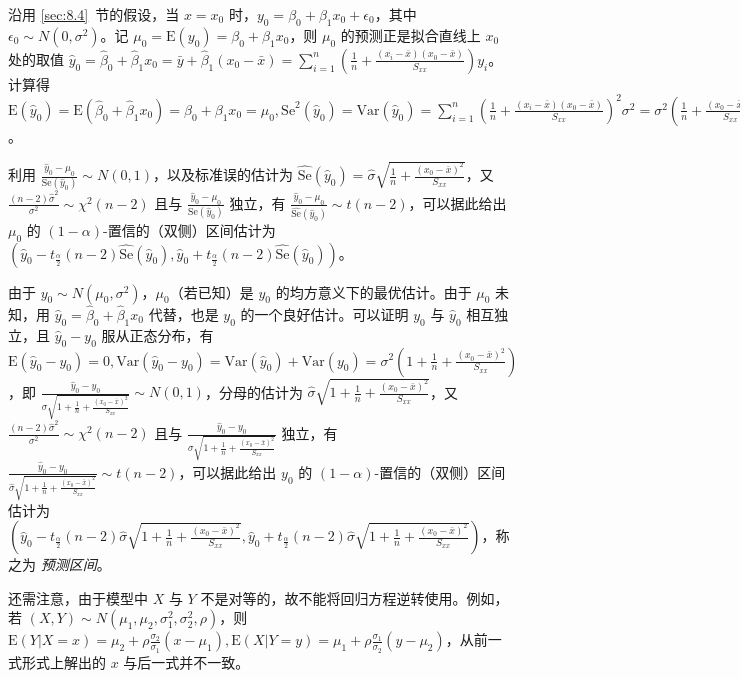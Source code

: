 \documentclass[../main.tex]{subfiles}
\begin{document}
沿用 \ref{sec:8.4}~节的假设，当 $x=x_0$ 时，$y_0=\beta_0+\beta_1x_0+\epsilon_0$，其中 $\epsilon_0\sim N(0,\sigma^2)$。记 $\mu_0=\mathrm E(y_0)=\beta_0+\beta_1x_0$，则 $\mu_0$ 的预测正是拟合直线上 $x_0$ 处的取值 $\hat y_0=\hat\beta_0+\hat\beta_1x_0=\bar y+\hat\beta_1(x_0-\bar x)=\sum_{i=1}^n(\frac1n+\frac{(x_i-\bar x)(x_0-\bar x)}{S_{xx}})y_i$。计算得 $\mathrm E(\hat y_0)=\mathrm E(\hat\beta_0+\hat\beta_1x_0)=\beta_0+\beta_1x_0=\mu_0,\mathrm{Se}^2(\hat y_0)=\mathrm{Var}(\hat y_0)=\sum_{i=1}^n(\frac1n+\frac{(x_i-\bar x)(x_0-\bar x)}{S_{xx}})^2\sigma^2=\sigma^2(\frac1n+\frac{(x_0-\bar x)^2}{S_{xx}})$。

利用 $\frac{\hat y_0-\mu_0}{\mathrm{Se}(\hat y_0)}\sim N(0,1)$，以及标准误的估计为 $\widehat{\mathrm{Se}}(\hat y_0)=\hat\sigma\sqrt{\frac1n+\frac{(x_0-\bar x)^2}{S_{xx}}}$，又 $\frac{(n-2)\hat\sigma^2}{\sigma^2}\sim\chi^2(n-2)$ 且与 $\frac{\hat y_0-\mu_0}{\mathrm{Se}(\hat y_0)}$ 独立，有 $\frac{\hat y_0-\mu_0}{\widehat{\mathrm{Se}}(\hat y_0)}\sim t(n-2)$，可以据此给出 $\mu_0$ 的 $(1-\alpha)$-置信的（双侧）区间估计为 $(\hat y_0-t_{\frac\alpha2}(n-2)\widehat{\mathrm{Se}}(\hat y_0),\hat y_0+t_{\frac\alpha2}(n-2)\widehat{\mathrm{Se}}(\hat y_0))$。

由于 $y_0\sim N(\mu_0,\sigma^2)$，$\mu_0$（若已知）是 $y_0$ 的均方意义下的最优估计。由于 $\mu_0$ 未知，用 $\hat y_0=\hat\beta_0+\hat\beta_1x_0$ 代替，也是 $y_0$ 的一个良好估计。可以证明 $y_0$ 与 $\hat y_0$ 相互独立，且 $\hat y_0-y_0$ 服从正态分布，有 $\mathrm E(\hat y_0-y_0)=0,\mathrm{Var}(\hat y_0-y_0)=\mathrm{Var}(\hat y_0)+\mathrm{Var}(y_0)=\sigma^2(1+\frac1n+\frac{(x_0-\bar x)^2}{S_{xx}})$，即 $\frac{\hat y_0-y_0}{\sigma\sqrt{1+\frac1n+\frac{(x_0-\bar x)^2}{S_{xx}}}}\sim N(0,1)$，分母的估计为 $\hat\sigma\sqrt{1+\frac1n+\frac{(x_0-\bar x)^2}{S_{xx}}}$，又 $\frac{(n-2)\hat\sigma^2}{\sigma^2}\sim\chi^2(n-2)$ 且与 $\frac{\hat y_0-y_0}{\sigma\sqrt{1+\frac1n+\frac{(x_0-\bar x)^2}{S_{xx}}}}$ 独立，有 $\frac{\hat y_0-y_0}{\hat\sigma\sqrt{1+\frac1n+\frac{(x_0-\bar x)^2}{S_{xx}}}}\sim t(n-2)$，可以据此给出 $y_0$ 的 $(1-\alpha)$-置信的（双侧）区间估计为 $(\hat y_0-t_{\frac\alpha2}(n-2)\hat\sigma\sqrt{1+\frac1n+\frac{(x_0-\bar x)^2}{S_{xx}}},\hat y_0+t_{\frac\alpha2}(n-2)\hat\sigma\sqrt{1+\frac1n+\frac{(x_0-\bar x)^2}{S_{xx}}})$，称之为 \emph{预测区间}。



还需注意，由于模型中 $X$ 与 $Y$ 不是对等的，故不能将回归方程逆转使用。例如，若 $(X,Y)\sim N(\mu_1,\mu_2,\sigma_1^2,\sigma_2^2,\rho)$，则 $\mathrm E(Y|X=x)=\mu_2+\rho\frac{\sigma_2}{\sigma_1}(x-\mu_1),\mathrm E(X|Y=y)=\mu_1+\rho\frac{\sigma_1}{\sigma_2}(y-\mu_2)$，从前一式形式上解出的 $x$ 与后一式并不一致。

\end{document}
